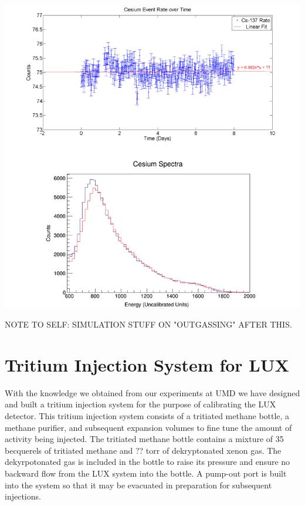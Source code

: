 \documentclass[a4paper,12pt]{article}
\begin{document}
\begin{center}
\includegraphics[scale=0.7]{Cesium_Combined_Fit.png}
\end{center}

NOTE TO SELF: SIMULATION STUFF ON "OUTGASSING" AFTER THIS.


\section{Tritium Injection System for LUX}

With the knowledge we obtained from our experiments at UMD we have designed and built a tritium injection system for the purpose of calibrating the LUX detector.  This tritium injection system consists of a tritiated methane bottle, a methane purifier, and subsequent expansion volumes to fine tune the amount of activity being injected.  The tritiated methane bottle contains a mixture of 35 becquerels of tritiated methane and ?? torr of dekryptonated xenon gas.  The dekyrpotonated gas is included in the bottle to raise its pressure and ensure no backward flow from the LUX system into the bottle.  A pump-out port is built into the system so that it may be evacuated in preparation for subsequent injections.
\end{document}
